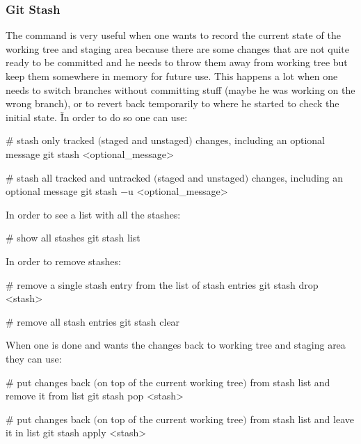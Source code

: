 \subsubsection{Git Stash}
The  command is very useful when one wants to record the current state of the working tree and
staging area because there are some changes that are not quite ready to be committed and he needs to throw them away
from working tree but keep them somewhere in memory for future use. This happens a lot when one needs to switch
branches without committing stuff (maybe he was working on the wrong branch), or to revert back temporarily to where
he started to check the initial state. \v

In order to do so one can use:

\begin{bash}
# stash only tracked $($staged and unstaged$)$ changes, including an optional message
git stash <optional_message>
\end{bash}

\begin{bash}
# stash all tracked and untracked $($staged and unstaged$)$ changes, including an optional message
git stash $-$u <optional_message>
\end{bash}

In order to see a list with all the stashes:

\begin{bash}
# show all stashes
git stash list
\end{bash}

In order to remove stashes:

\begin{bash}
# remove a single stash entry from the list of stash entries
git stash drop <stash>
\end{bash}

\begin{bash}
# remove all stash entries
git stash clear
\end{bash}

When one is done and wants the changes back to working tree and staging area they can use:

\begin{bash}
# put changes back $($on top of the current working tree$)$ from stash list and remove it from list
git stash pop <stash>
\end{bash}

\begin{bash}
# put changes back $($on top of the current working tree$)$ from stash list and leave it in list
git stash apply <stash>
\end{bash}

